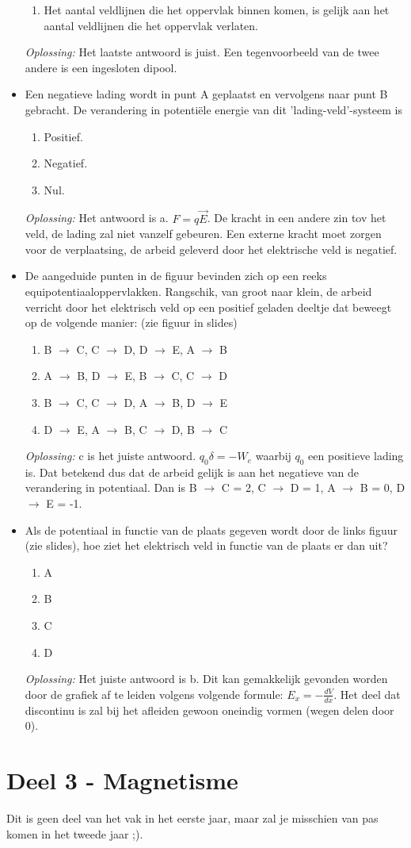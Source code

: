 \documentclass[12pt,a4paper]{article}
\begin{document}
\begin{itemize}
\begin{enumerate}[label=\alph*]
		\item Het aantal veldlijnen die het oppervlak binnen komen, is gelijk aan het aantal veldlijnen die het oppervlak verlaten. 
	\end{enumerate}
	\textit{Oplossing:} Het laatste antwoord is juist. Een tegenvoorbeeld van de twee andere is een ingesloten dipool. 
	\item Een negatieve lading wordt in punt A geplaatst en vervolgens naar punt B gebracht. De verandering in potentiële energie van dit 'lading-veld'-systeem is
	\begin{enumerate}[label=\alph*]
		\item Positief.
		\item Negatief.
		\item Nul.
	\end{enumerate}
	\textit{Oplossing:} Het antwoord is a. \(F = q\vec{E}\). De kracht in een andere zin tov het veld, de lading zal niet vanzelf gebeuren. Een externe kracht moet zorgen voor de verplaatsing, de arbeid geleverd door het elektrische veld is negatief.
	\item De aangeduide punten in de figuur bevinden zich op een reeks equipotentiaaloppervlakken. Rangschik, van groot naar klein, de arbeid verricht door het elektrisch veld op een positief geladen deeltje dat beweegt op de volgende manier: (zie figuur in slides)
	\begin{enumerate}[label=\alph*]
		\item B $\rightarrow$ C, C $\rightarrow$ D, D $\rightarrow$ E, A $\rightarrow$ B
		\item A $\rightarrow$ B, D $\rightarrow$ E, B $\rightarrow$ C, C $\rightarrow$ D
		\item B $\rightarrow$ C, C $\rightarrow$ D, A $\rightarrow$ B, D $\rightarrow$ E
		\item D $\rightarrow$ E, A $\rightarrow$ B, C $\rightarrow$ D, B $\rightarrow$ C
	\end{enumerate}
	\textit{Oplossing:} c is het juiste antwoord. \(q_0 \delta = -W_e\) waarbij $q_0$ een positieve lading is. Dat betekend dus dat de arbeid gelijk is aan het negatieve van de verandering in potentiaal. Dan is B $\rightarrow$ C = 2, C $\rightarrow$ D = 1, A $\rightarrow$ B = 0, D $\rightarrow$ E = -1.
	\item Als de potentiaal in functie van de plaats gegeven wordt door de links figuur (zie slides), hoe ziet het elektrisch veld in functie van de plaats er dan uit?
	\begin{enumerate}[label=\alph*]
		\item A
		\item B
		\item C
		\item D
	\end{enumerate}
	\textit{Oplossing:} Het juiste antwoord is b. Dit kan gemakkelijk gevonden worden door de grafiek af te leiden volgens volgende formule: \(E_x = -\frac{dV}{dx}\). Het deel dat discontinu is zal bij het afleiden gewoon oneindig vormen (wegen delen door 0).
	\end{itemize}
    \newpage

    \section{Deel 3 - Magnetisme}
    Dit is geen deel van het vak in het eerste jaar, maar zal je misschien van pas komen in het tweede jaar ;).
\end{document}
